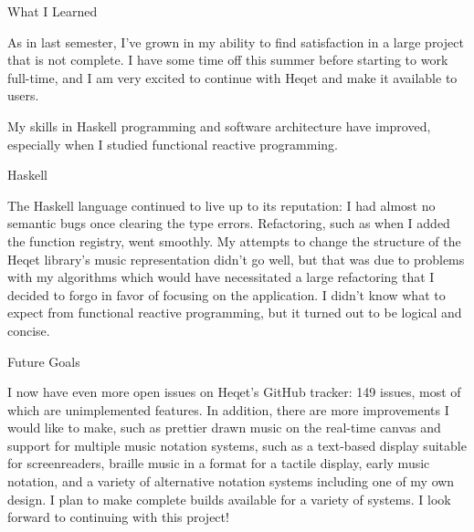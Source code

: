 \documentclass{article}
\begin{document}
\begin{section}{What I Learned}

As in last semester, I've grown in my ability to find satisfaction in a large project that is not complete. I have some time off this summer before starting to work full-time, and I am very excited to continue with Heqet and make it available to users.

My skills in Haskell programming and software architecture have improved, especially when I studied functional reactive programming.

\end{section}
\begin{section}{Haskell}

The Haskell language continued to live up to its reputation: I had almost no semantic bugs once clearing the type errors. Refactoring, such as when I added the function registry, went smoothly. My  attempts to change the structure of the Heqet library's music representation didn't go well, but that was due to problems with my algorithms which would have necessitated a large refactoring that I decided to forgo in favor of focusing on the application. I didn't know what to expect from functional reactive programming, but it turned out to be logical and concise.
\end{section}

\begin{section}{Future Goals}

I now have even more open issues on Heqet's GitHub tracker: 149 issues, most of which are unimplemented features. In addition, there are more improvements I would like to make, such as prettier drawn music on the real-time canvas and support for multiple music notation systems, such as a text-based display suitable for screenreaders, braille music in a format for a tactile display, early music notation, and a variety of alternative notation systems including one of my own design. I plan to make complete builds available for a variety of systems. I look forward to continuing with this project!

\end{section}
\end{document}
